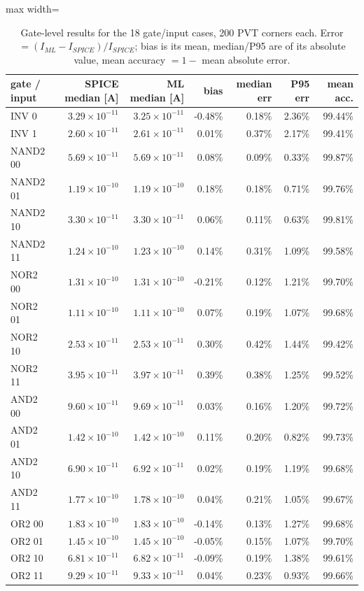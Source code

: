 \begin{table}[H]
\centering
{\small
\begin{adjustbox}{max width=\linewidth}
\begin{tabular}{lrrrrrr}
\toprule
gate / input & SPICE median [A] & ML median [A] & bias & median err & P95 err & mean acc. \\
\midrule
INV 0 & $3.29\times10^{-11}$ & $3.25\times10^{-11}$ & -0.48\% & 0.18\% & 2.36\% & 99.44\% \\
INV 1 & $2.60\times10^{-11}$ & $2.61\times10^{-11}$ & 0.01\% & 0.37\% & 2.17\% & 99.41\% \\
NAND2 00 & $5.69\times10^{-11}$ & $5.69\times10^{-11}$ & 0.08\% & 0.09\% & 0.33\% & 99.87\% \\
NAND2 01 & $1.19\times10^{-10}$ & $1.19\times10^{-10}$ & 0.18\% & 0.18\% & 0.71\% & 99.76\% \\
NAND2 10 & $3.30\times10^{-11}$ & $3.30\times10^{-11}$ & 0.06\% & 0.11\% & 0.63\% & 99.81\% \\
NAND2 11 & $1.24\times10^{-10}$ & $1.23\times10^{-10}$ & 0.14\% & 0.31\% & 1.09\% & 99.58\% \\
NOR2 00 & $1.31\times10^{-10}$ & $1.31\times10^{-10}$ & -0.21\% & 0.12\% & 1.21\% & 99.70\% \\
NOR2 01 & $1.11\times10^{-10}$ & $1.11\times10^{-10}$ & 0.07\% & 0.19\% & 1.07\% & 99.68\% \\
NOR2 10 & $2.53\times10^{-11}$ & $2.53\times10^{-11}$ & 0.30\% & 0.42\% & 1.44\% & 99.42\% \\
NOR2 11 & $3.95\times10^{-11}$ & $3.97\times10^{-11}$ & 0.39\% & 0.38\% & 1.25\% & 99.52\% \\
AND2 00 & $9.60\times10^{-11}$ & $9.69\times10^{-11}$ & 0.03\% & 0.16\% & 1.20\% & 99.72\% \\
AND2 01 & $1.42\times10^{-10}$ & $1.42\times10^{-10}$ & 0.11\% & 0.20\% & 0.82\% & 99.73\% \\
AND2 10 & $6.90\times10^{-11}$ & $6.92\times10^{-11}$ & 0.02\% & 0.19\% & 1.19\% & 99.68\% \\
AND2 11 & $1.77\times10^{-10}$ & $1.78\times10^{-10}$ & 0.04\% & 0.21\% & 1.05\% & 99.67\% \\
OR2 00 & $1.83\times10^{-10}$ & $1.83\times10^{-10}$ & -0.14\% & 0.13\% & 1.27\% & 99.68\% \\
OR2 01 & $1.45\times10^{-10}$ & $1.45\times10^{-10}$ & -0.05\% & 0.15\% & 1.07\% & 99.70\% \\
OR2 10 & $6.81\times10^{-11}$ & $6.82\times10^{-11}$ & -0.09\% & 0.19\% & 1.38\% & 99.61\% \\
OR2 11 & $9.29\times10^{-11}$ & $9.33\times10^{-11}$ & 0.04\% & 0.23\% & 0.93\% & 99.66\% \\
\bottomrule
\end{tabular}
\end{adjustbox}
}
\caption{Gate-level results for the 18 gate/input cases, 200 PVT corners each. Error $=(I_{ML}-I_{SPICE})/I_{SPICE}$; bias is its mean, median/P95 are of its absolute value, mean accuracy $=1-$ mean absolute error.}
\label{tab:gates}
\end{table}

